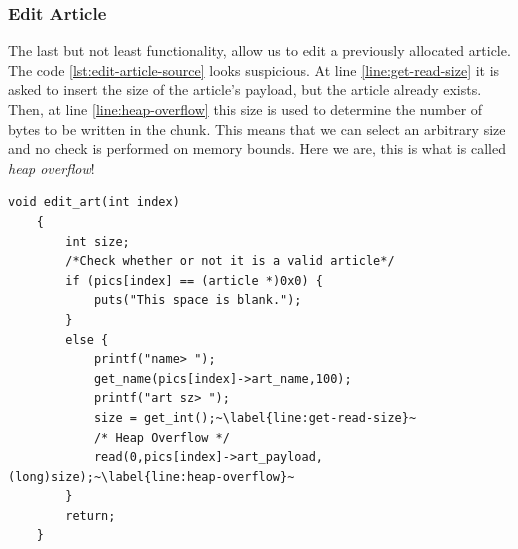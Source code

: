 \documentclass{article}
\numberwithin{equation}{subsection}
\begin{document}
\subsubsection{Edit Article}
The last but not least functionality, allow us to edit a previously allocated article. The code \ref{lst:edit-article-source} looks suspicious. At line \ref{line:get-read-size} it is asked to insert the size of the article's payload, but the article already exists. Then, at line \ref{line:heap-overflow} this size is used to determine the number of bytes to be written in the chunk. This means that we can select an arbitrary size and no check is performed on memory bounds. Here we are, this is what is called \emph{heap overflow}!\newline
\noindent
\begin{minipage}{\textwidth}
\centering
\lstset{style=cstyle}
\begin{lstlisting}[caption={Edit\_article routine of asciigal source code.},captionpos=b,label={lst:edit-article-source}]
    void edit_art(int index)
	{
		int size;
        /*Check whether or not it is a valid article*/
		if (pics[index] == (article *)0x0) {
			puts("This space is blank.");
		}
		else {
			printf("name> ");
			get_name(pics[index]->art_name,100);
			printf("art sz> ");
			size = get_int();~\label{line:get-read-size}~
			/* Heap Overflow */
			read(0,pics[index]->art_payload,(long)size);~\label{line:heap-overflow}~
		}
		return;
	}
\end{lstlisting}
\end{minipage}
\end{document}

